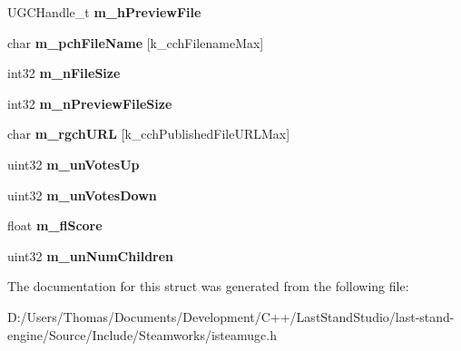 \begin{DoxyCompactItemize}
\item 
\hypertarget{structSteamUGCDetails__t_a3de5c0f9f6f23c26db773cc3aaf4b84f}{}U\+G\+C\+Handle\+\_\+t {\bfseries m\+\_\+h\+Preview\+File}\label{structSteamUGCDetails__t_a3de5c0f9f6f23c26db773cc3aaf4b84f}

\item 
\hypertarget{structSteamUGCDetails__t_aff754eedde6ce8f1ebbcf94c32328946}{}char {\bfseries m\+\_\+pch\+File\+Name} \mbox{[}k\+\_\+cch\+Filename\+Max\mbox{]}\label{structSteamUGCDetails__t_aff754eedde6ce8f1ebbcf94c32328946}

\item 
\hypertarget{structSteamUGCDetails__t_a1889aedab86b30ea6b1be103387d465f}{}int32 {\bfseries m\+\_\+n\+File\+Size}\label{structSteamUGCDetails__t_a1889aedab86b30ea6b1be103387d465f}

\item 
\hypertarget{structSteamUGCDetails__t_a32a19a36c0f0a19a90371f1b830c04ca}{}int32 {\bfseries m\+\_\+n\+Preview\+File\+Size}\label{structSteamUGCDetails__t_a32a19a36c0f0a19a90371f1b830c04ca}

\item 
\hypertarget{structSteamUGCDetails__t_a4763e499ea2f9762562fe3c73cf49fa1}{}char {\bfseries m\+\_\+rgch\+U\+R\+L} \mbox{[}k\+\_\+cch\+Published\+File\+U\+R\+L\+Max\mbox{]}\label{structSteamUGCDetails__t_a4763e499ea2f9762562fe3c73cf49fa1}

\item 
\hypertarget{structSteamUGCDetails__t_a033649aebaa34c333b0acb3c4166e04a}{}uint32 {\bfseries m\+\_\+un\+Votes\+Up}\label{structSteamUGCDetails__t_a033649aebaa34c333b0acb3c4166e04a}

\item 
\hypertarget{structSteamUGCDetails__t_aecfa3981942d1bf472c56814f0e1bf17}{}uint32 {\bfseries m\+\_\+un\+Votes\+Down}\label{structSteamUGCDetails__t_aecfa3981942d1bf472c56814f0e1bf17}

\item 
\hypertarget{structSteamUGCDetails__t_a238c83e2101c31de76e89195d81ae0a8}{}float {\bfseries m\+\_\+fl\+Score}\label{structSteamUGCDetails__t_a238c83e2101c31de76e89195d81ae0a8}

\item 
\hypertarget{structSteamUGCDetails__t_a6e742b2342bed5aada102eb9d4ed446e}{}uint32 {\bfseries m\+\_\+un\+Num\+Children}\label{structSteamUGCDetails__t_a6e742b2342bed5aada102eb9d4ed446e}

\end{DoxyCompactItemize}


The documentation for this struct was generated from the following file\+:\begin{DoxyCompactItemize}
\item 
D\+:/\+Users/\+Thomas/\+Documents/\+Development/\+C++/\+Last\+Stand\+Studio/last-\/stand-\/engine/\+Source/\+Include/\+Steamworks/isteamugc.\+h\end{DoxyCompactItemize}
